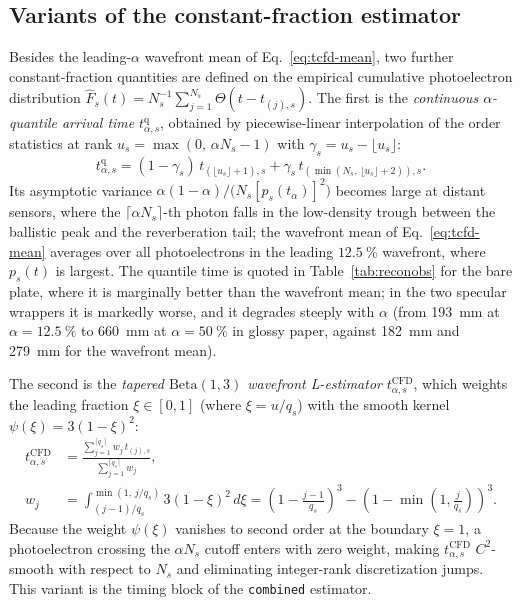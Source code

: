 \documentclass[11pt,a4paper]{article}
\begin{document}
\subsection{Variants of the constant-fraction estimator}
\label{app:recon-cfd}

Besides the leading-$\alpha$ wavefront mean of Eq.~\ref{eq:tcfd-mean}, two
further constant-fraction quantities are defined on the empirical cumulative
photoelectron distribution
$\hat F_s(t) = N_s^{-1}\sum_{j=1}^{N_s}\Theta(t - t_{(j),s})$.
The first is the \emph{continuous $\alpha$-quantile arrival time}
$t^{\mathrm{q}}_{\alpha,s}$, obtained by piecewise-linear interpolation of the
order statistics at rank $u_s = \max(0,\, \alpha N_s - 1)$ with
$\gamma_s = u_s - \lfloor u_s\rfloor$:
\begin{equation}
  t^{\mathrm{q}}_{\alpha,s}
  = (1 - \gamma_s)\,t_{(\lfloor u_s\rfloor + 1),s}
    + \gamma_s\,t_{(\min(N_s,\,\lfloor u_s\rfloor + 2)),s}.
  \label{eq:tcfd-point}
\end{equation}
Its asymptotic variance
$\alpha(1-\alpha)/\bigl(N_s [p_s(t_\alpha)]^2\bigr)$ becomes large at distant
sensors, where the $\lceil\alpha N_s\rceil$-th photon falls in the low-density
trough between the ballistic peak and the reverberation tail; the wavefront
mean of Eq.~\ref{eq:tcfd-mean} averages over all photoelectrons in the
leading $\SI{12.5}{\percent}$ wavefront, where $p_s(t)$ is largest.  The
quantile time is quoted in Table~\ref{tab:reconobs} for the bare plate, where
it is marginally better than the wavefront mean; in the two specular wrappers
it is markedly worse, and it degrades steeply with $\alpha$ (from
\SI{193}{\milli\meter} at $\alpha = \SI{12.5}{\percent}$ to
\SI{660}{\milli\meter} at $\alpha = \SI{50}{\percent}$ in glossy paper,
against \SI{182}{\milli\meter} and \SI{279}{\milli\meter} for the wavefront
mean).

The second is the \emph{tapered $\mathrm{Beta}(1,3)$ wavefront L-estimator}
$t^{\mathrm{CFD}}_{\alpha,s}$, which weights the leading fraction
$\xi \in [0,1]$ (where $\xi = u / q_s$) with the smooth kernel
$\psi(\xi) = 3(1-\xi)^2$:
\begin{align}
  t^{\mathrm{CFD}}_{\alpha,s}
  &= \frac{\sum_{j=1}^{\lceil q_s\rceil} w_j\,t_{(j),s}}
          {\sum_{j=1}^{\lceil q_s\rceil} w_j}, \nonumber\\[2pt]
  w_j &= \int_{(j-1)/q_s}^{\min(1,\,j/q_s)} 3(1-\xi)^2\,d\xi
       = \left(1 - \frac{j-1}{q_s}\right)^{\!3}
        - \left(1 - \min\!\left(1,\frac{j}{q_s}\right)\right)^{\!3}.
  \label{eq:tcfd-taper}
\end{align}
Because the weight $\psi(\xi)$ vanishes to second order at the boundary
$\xi = 1$, a photoelectron crossing the $\alpha N_s$ cutoff enters with
zero weight, making $t^{\mathrm{CFD}}_{\alpha,s}$ $C^2$-smooth with
respect to $N_s$ and eliminating integer-rank discretization jumps.  This
variant is the timing block of the \texttt{combined} estimator.
\end{document}
